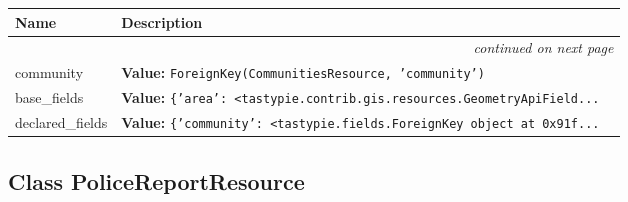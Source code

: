     \vspace{-1cm}
\hspace{\varindent}\begin{longtable}{|p{\varnamewidth}|p{\vardescrwidth}|l}
\cline{1-2}
\cline{1-2} \centering \textbf{Name} & \centering \textbf{Description}& \\
\cline{1-2}
\endhead\cline{1-2}\multicolumn{3}{r}{\small\textit{continued on next page}}\\\endfoot\cline{1-2}
\endlastfoot\raggedright c\-o\-m\-m\-u\-n\-i\-t\-y\- & \raggedright \textbf{Value:} 
{\tt ForeignKey(CommunitiesResource, 'community')}&\\
\cline{1-2}
\raggedright b\-a\-s\-e\-\_\-f\-i\-e\-l\-d\-s\- & \raggedright \textbf{Value:} 
{\tt \texttt{\{}\texttt{'}\texttt{area}\texttt{'}\texttt{: }{\textless}tastypie.contrib.gis.resources.GeometryApiField\texttt{...}}&\\
\cline{1-2}
\raggedright d\-e\-c\-l\-a\-r\-e\-d\-\_\-f\-i\-e\-l\-d\-s\- & \raggedright \textbf{Value:} 
{\tt \texttt{\{}\texttt{'}\texttt{community}\texttt{'}\texttt{: }{\textless}tastypie.fields.ForeignKey object at 0x91f\texttt{...}}&\\
\cline{1-2}
\end{longtable}



\subsection{Class PoliceReportResource}

